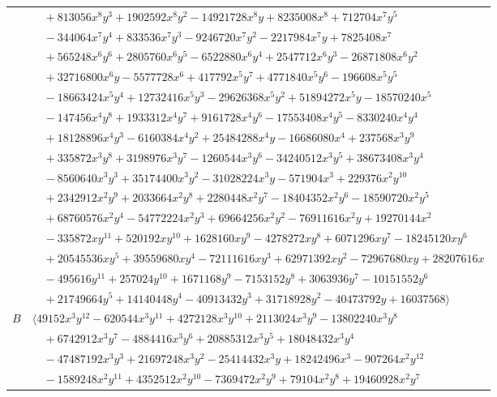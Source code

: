 \documentclass[11pt]{article}
\begin{document}
\begin{longtable}{@{}ll@{}}
 & $\quad +813056x^{8}y^{3}+1902592x^{8}y^{2}-14921728x^{8}y+8235008x^{8}+712704x^{7}y^{5}$\\
 & $\quad -344064x^{7}y^{4}+833536x^{7}y^{3}-9246720x^{7}y^{2}-2217984x^{7}y+7825408x^{7}$\\
 & $\quad +565248x^{6}y^{6}+2805760x^{6}y^{5}-6522880x^{6}y^{4}+2547712x^{6}y^{3}-26871808x^{6}y^{2}$\\
 & $\quad +32716800x^{6}y-5577728x^{6}+417792x^{5}y^{7}+4771840x^{5}y^{6}-196608x^{5}y^{5}$\\
 & $\quad -18663424x^{5}y^{4}+12732416x^{5}y^{3}-29626368x^{5}y^{2}+51894272x^{5}y-18570240x^{5}$\\
 & $\quad -147456x^{4}y^{8}+1933312x^{4}y^{7}+9161728x^{4}y^{6}-17553408x^{4}y^{5}-8330240x^{4}y^{4}$\\
 & $\quad +18128896x^{4}y^{3}-6160384x^{4}y^{2}+25484288x^{4}y-16686080x^{4}+237568x^{3}y^{9}$\\
 & $\quad +335872x^{3}y^{8}+3198976x^{3}y^{7}-1260544x^{3}y^{6}-34240512x^{3}y^{5}+38673408x^{3}y^{4}$\\
 & $\quad -8560640x^{3}y^{3}+35174400x^{3}y^{2}-31028224x^{3}y-571904x^{3}+229376x^{2}y^{10}$\\
 & $\quad +2342912x^{2}y^{9}+2033664x^{2}y^{8}+2280448x^{2}y^{7}-18404352x^{2}y^{6}-18590720x^{2}y^{5}$\\
 & $\quad +68760576x^{2}y^{4}-54772224x^{2}y^{3}+69664256x^{2}y^{2}-76911616x^{2}y+19270144x^{2}$\\
 & $\quad -335872xy^{11}+520192xy^{10}+1628160xy^{9}-4278272xy^{8}+6071296xy^{7}-18245120xy^{6}$\\
 & $\quad +20545536xy^{5}+39559680xy^{4}-72111616xy^{3}+62971392xy^{2}-72967680xy+28207616x$\\
 & $\quad -495616y^{11}+257024y^{10}+1671168y^{9}-7153152y^{8}+3063936y^{7}-10151552y^{6}$\\
 & $\quad +21749664y^{5}+14140448y^{4}-40913432y^{3}+31718928y^{2}-40473792y+16037568\rangle$\\
$B$ & $\langle 49152x^{3}y^{12}-620544x^{3}y^{11}+4272128x^{3}y^{10}+2113024x^{3}y^{9}-13802240x^{3}y^{8}$\\
 & $\quad +6742912x^{3}y^{7}-4884416x^{3}y^{6}+20885312x^{3}y^{5}+18048432x^{3}y^{4}$\\
 & $\quad -47487192x^{3}y^{3}+21697248x^{3}y^{2}-25414432x^{3}y+18242496x^{3}-907264x^{2}y^{12}$\\
 & $\quad -1589248x^{2}y^{11}+4352512x^{2}y^{10}-7369472x^{2}y^{9}+79104x^{2}y^{8}+19460928x^{2}y^{7}$\\

\end{longtable}
\end{document}
